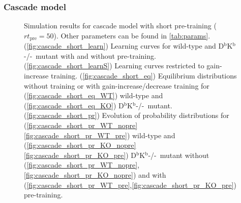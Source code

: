 \documentclass[12pt]{article}
\newcommand{\KO}{D$^\mathrm{b}$K$^\mathrm{b}$-/-}
\begin{document}
\subsubsection{Cascade model}\label{sec:cascade}

\begin{figure}
 \begin{center}
 \begin{myenuma}
  \item{}\label{fig:cascade_short_learn}
  \item{}\label{fig:cascade_short_learnS}
  \item\label{fig:cascade_short_eq}\begin{myenumi}
                    \item{}\label{fig:cascade_short_eq_WT}
                    \item{}\label{fig:cascade_short_eq_KO}
                  \end{myenumi}
  \item\label{fig:cascade_short_pr}\begin{myenumi}
                    \item{}\label{fig:cascade_short_pr_WT_nopre}
                    \item{}\label{fig:cascade_short_pr_WT_pre}
                    \item{}\label{fig:cascade_short_pr_KO_nopre}
                    \item{}\label{fig:cascade_short_pr_KO_pre}
                  \end{myenumi}
 \end{myenuma}
 \end{center}
  \caption{Simulation results for cascade model with short pre-training ($rt_\text{pre}=50$).
  Other parameters can be found in \autoref{tab:params}.
  (\ref{fig:cascade_short_learn}) Learning curves for wild-type and \KO\ mutant with and without pre-training.
  (\ref{fig:cascade_short_learnS}) Learning curves restricted to gain-increase training.
  (\ref{fig:cascade_short_eq}) Equilibrium distributions without training or with gain-increase/decrease training for (\ref{fig:cascade_short_eq_WT}) wild-type and (\ref{fig:cascade_short_eq_KO}) \KO\ mutant.
  (\ref{fig:cascade_short_pr}) Evolution of probability distributions for (\ref{fig:cascade_short_pr_WT_nopre}\ref{fig:cascade_short_pr_WT_pre}) wild-type and  (\ref{fig:cascade_short_pr_KO_nopre}\ref{fig:cascade_short_pr_KO_pre}) \KO\ mutant without (\ref{fig:cascade_short_pr_WT_nopre},\ref{fig:cascade_short_pr_KO_nopre}) and with (\ref{fig:cascade_short_pr_WT_pre},\ref{fig:cascade_short_pr_KO_pre}) pre-training. } \label{fig:cascade_short}
\end{figure}
\end{document}
